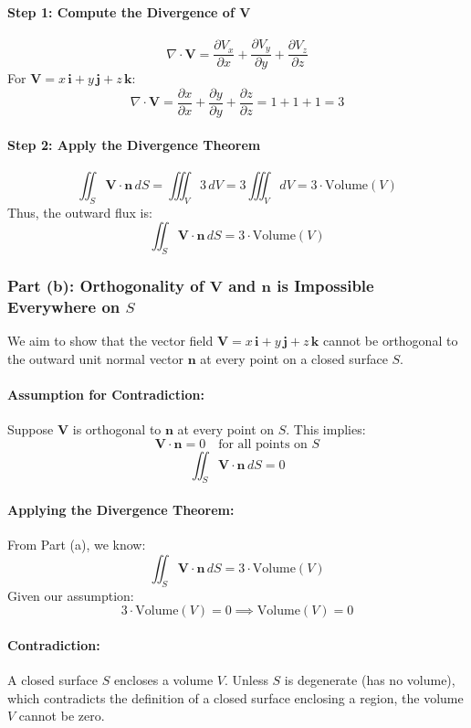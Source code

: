 \documentclass[11pt]{article}
\begin{document}
\paragraph{Step 1: Compute the Divergence of \( \mathbf{V} \)}
\[
\nabla \cdot \mathbf{V} = \frac{\partial V_x}{\partial x} + \frac{\partial V_y}{\partial y} + \frac{\partial V_z}{\partial z}
\]
For \( \mathbf{V} = x\,\mathbf{i} + y\,\mathbf{j} + z\,\mathbf{k} \):
\[
\nabla \cdot \mathbf{V} = \frac{\partial x}{\partial x} + \frac{\partial y}{\partial y} + \frac{\partial z}{\partial z} = 1 + 1 + 1 = 3
\]

\paragraph{Step 2: Apply the Divergence Theorem}
\[
\iint_{S} \mathbf{V} \cdot \mathbf{n} \, dS = \iiint_{V} 3 \, dV = 3 \iiint_{V} dV = 3 \cdot \text{Volume}(V)
\]
Thus, the outward flux is:
\[
\boxed{ \iint_{S} \mathbf{V} \cdot \mathbf{n} \, dS = 3 \cdot \text{Volume}(V) }
\]

\subsubsection*{Part (b): Orthogonality of \( \mathbf{V} \) and \( \mathbf{n} \) is Impossible Everywhere on \( S \)}

We aim to show that the vector field \( \mathbf{V} = x\,\mathbf{i} + y\,\mathbf{j} + z\,\mathbf{k} \) cannot be orthogonal to the outward unit normal vector \( \mathbf{n} \) at every point on a closed surface \( S \).

\paragraph{Assumption for Contradiction:}
Suppose \( \mathbf{V} \) is orthogonal to \( \mathbf{n} \) at every point on \( S \). This implies:
\[
\mathbf{V} \cdot \mathbf{n} = 0 \quad \text{for all points on } S
\]
\[
\iint_{S} \mathbf{V} \cdot \mathbf{n} \, dS = 0
\]

\paragraph{Applying the Divergence Theorem:}
From Part (a), we know:
\[
\iint_{S} \mathbf{V} \cdot \mathbf{n} \, dS = 3 \cdot \text{Volume}(V)
\]
Given our assumption:
\[
3 \cdot \text{Volume}(V) = 0 \implies \text{Volume}(V) = 0
\]
\paragraph{Contradiction:}
A closed surface \( S \) encloses a volume \( V \). Unless \( S \) is degenerate (has no volume), which contradicts the definition of a closed surface enclosing a region, the volume \( V \) cannot be zero.
\end{document}
